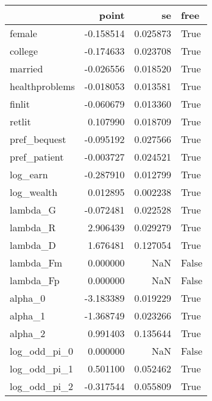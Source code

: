 \begin{tabular}{lrrl}
\toprule
{} &     point &        se &   free \\
\midrule
female         & -0.158514 &  0.025873 &   True \\
college        & -0.174633 &  0.023708 &   True \\
married        & -0.026556 &  0.018520 &   True \\
healthproblems & -0.018053 &  0.013581 &   True \\
finlit         & -0.060679 &  0.013360 &   True \\
retlit         &  0.107990 &  0.018709 &   True \\
pref\_bequest   & -0.095192 &  0.027566 &   True \\
pref\_patient   & -0.003727 &  0.024521 &   True \\
log\_earn       & -0.287910 &  0.012799 &   True \\
log\_wealth     &  0.012895 &  0.002238 &   True \\
lambda\_G       & -0.072481 &  0.022528 &   True \\
lambda\_R       &  2.906439 &  0.029279 &   True \\
lambda\_D       &  1.676481 &  0.127054 &   True \\
lambda\_Fm      &  0.000000 &       NaN &  False \\
lambda\_Fp      &  0.000000 &       NaN &  False \\
alpha\_0        & -3.183389 &  0.019229 &   True \\
alpha\_1        & -1.368749 &  0.023266 &   True \\
alpha\_2        &  0.991403 &  0.135644 &   True \\
log\_odd\_pi\_0   &  0.000000 &       NaN &  False \\
log\_odd\_pi\_1   &  0.501100 &  0.052462 &   True \\
log\_odd\_pi\_2   & -0.317544 &  0.055809 &   True \\
\bottomrule
\end{tabular}
